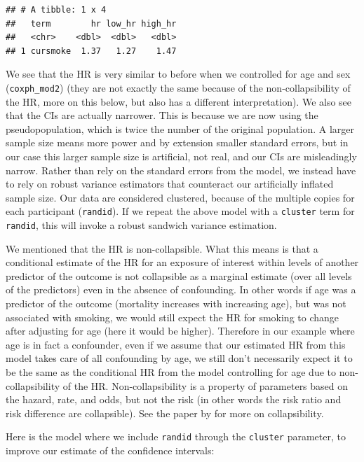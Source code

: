 \documentclass[
]{book}
\begin{document}
\begin{verbatim}
## # A tibble: 1 x 4
##   term        hr low_hr high_hr
##   <chr>    <dbl>  <dbl>   <dbl>
## 1 cursmoke  1.37   1.27    1.47
\end{verbatim}

We see that the HR is very similar to before when we controlled for age and sex (\texttt{coxph\_mod2}) (they are not exactly the same because of the non-collapsibility of the HR, more on this below, but also has a different interpretation). We also see that the CIs are actually narrower. This is because we are now using the pseudopopulation, which is twice the number of the original population. A larger sample size means more power and by extension smaller standard errors, but in our case this larger sample size is artificial, not real, and our CIs are misleadingly narrow. Rather than rely on the standard errors from the model, we instead have to rely on robust variance estimators that counteract our artificially inflated sample size. Our data are considered clustered, because of the multiple copies for each participant (\texttt{randid}). If we repeat the above model with a \texttt{cluster} term for \texttt{randid}, this will invoke a robust sandwich variance estimation.

We mentioned that the HR is non-collapsible. What this means is that a conditional estimate of the HR for an exposure of interest within levels of another predictor of the outcome is not collapsible as a marginal estimate (over all levels of the predictors) even in the absence of confounding. In other words if age was a predictor of the outcome (mortality increases with increasing age), but was not associated with smoking, we would still expect the HR for smoking to change after adjusting for age (here it would be higher). Therefore in our example where age is in fact a confounder, even if we assume that our estimated HR from this model takes care of all confounding by age, we still don't necessarily expect it to be the same as the conditional HR from the model controlling for age due to non-collapsibility of the HR. Non-collapsibility is a property of parameters based on the hazard, rate, and odds, but not the risk (in other words the risk ratio and risk difference are collapsible). See the paper by \citet{greenland1999confounding} for more on collapsibility.

Here is the model where we include \texttt{randid} through the \texttt{cluster} parameter, to improve our estimate of the confidence intervals:
\end{document}
